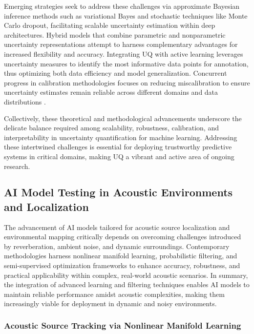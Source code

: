 \documentclass[sigconf]{acmart}
\begin{document}
Emerging strategies seek to address these challenges via approximate Bayesian inference methods such as variational Bayes and stochastic techniques like Monte Carlo dropout, facilitating scalable uncertainty estimation within deep architectures. Hybrid models that combine parametric and nonparametric uncertainty representations attempt to harness complementary advantages for increased flexibility and accuracy. Integrating UQ with active learning leverages uncertainty measures to identify the most informative data points for annotation, thus optimizing both data efficiency and model generalization. Concurrent progress in calibration methodologies focuses on reducing miscalibration to ensure uncertainty estimates remain reliable across different domains and data distributions \cite{ref28}.

Collectively, these theoretical and methodological advancements underscore the delicate balance required among scalability, robustness, calibration, and interpretability in uncertainty quantification for machine learning. Addressing these intertwined challenges is essential for deploying trustworthy predictive systems in critical domains, making UQ a vibrant and active area of ongoing research.

\subsection{AI Model Testing in Acoustic Environments and Localization}

The advancement of AI models tailored for acoustic source localization and environmental mapping critically depends on overcoming challenges introduced by reverberation, ambient noise, and dynamic surroundings. Contemporary methodologies harness nonlinear manifold learning, probabilistic filtering, and semi-supervised optimization frameworks to enhance accuracy, robustness, and practical applicability within complex, real-world acoustic scenarios. In summary, the integration of advanced learning and filtering techniques enables AI models to maintain reliable performance amidst acoustic complexities, making them increasingly viable for deployment in dynamic and noisy environments.

\subsubsection{Acoustic Source Tracking via Nonlinear Manifold Learning}
\end{document}
